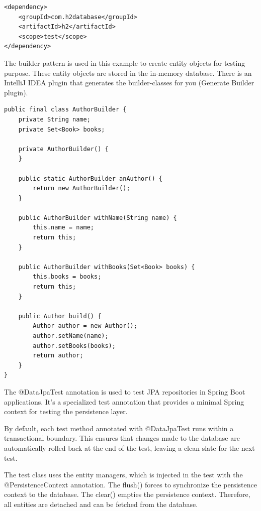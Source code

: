 \begin{lstlisting}
<dependency>
	<groupId>com.h2database</groupId>
	<artifactId>h2</artifactId>
	<scope>test</scope>
</dependency>
\end{lstlisting}

The builder pattern is used in this example to create entity objects for testing purpose. These entity objects are stored in the in-memory database. There is an IntelliJ IDEA plugin that generates the builder-classes for you (Generate Builder plugin).

\begin{lstlisting}
public final class AuthorBuilder {
    private String name;
    private Set<Book> books;

    private AuthorBuilder() {
    }

    public static AuthorBuilder anAuthor() {
        return new AuthorBuilder();
    }

    public AuthorBuilder withName(String name) {
        this.name = name;
        return this;
    }

    public AuthorBuilder withBooks(Set<Book> books) {
        this.books = books;
        return this;
    }

    public Author build() {
        Author author = new Author();
        author.setName(name);
        author.setBooks(books);
        return author;
    }
}
\end{lstlisting}

The @DataJpaTest annotation is used to test JPA repositories in Spring Boot applications. It’s a specialized test annotation that provides a minimal Spring context for testing the persistence layer. 

By default, each test method annotated with @DataJpaTest runs within a transactional boundary. This ensures that changes made to the database are automatically rolled back at the end of the test, leaving a clean slate for the next test.

The test class uses the entity managers, which is injected in the test with the @PersistenceContext annotation. The flush() forces to synchronize the persistence context to the database. The clear() empties the persistence context. Therefore, all entities are detached and can be fetched from the database.


